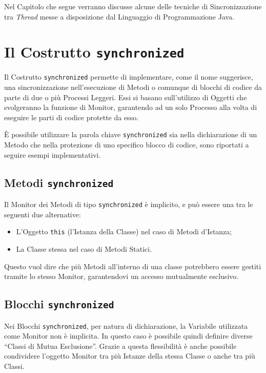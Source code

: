 Nel Capitolo che segue verranno discusse alcune delle tecniche di Sincronizzazione tra \textit{Thread} messe a disposizione dal Linguaggio di Programmazione Java.

\section{Il Costrutto \texttt{synchronized}}
Il Costrutto \texttt{synchronized} permette di implementare, come il nome suggerisce, una sincronizzazione nell'esecuzione di Metodi o comunque di blocchi di codice da parte di due o più Processi Leggeri\cite{Synchronized_JavaTutorial}. Essi si basano sull'utilizzo di Oggetti che svolgeranno la funzione di Monitor, garantendo ad un solo Processo alla volta di eseguire le parti di codice protette da esso. \par
È possibile utilizzare la parola chiave \texttt{synchronized} sia nella dichiarazione di un Metodo che nella protezione di uno specifico blocco di codice, sono riportati a seguire esempi implementativi.

\subsection{Metodi \texttt{synchronized}}
Il Monitor dei Metodi di tipo \texttt{synchronized} è implicito, e può essere una tra le seguenti due alternative:
\begin{itemize}
    \item L'Oggetto \texttt{this} (l'Istanza della Classe) nel caso di Metodi d'Istanza;
    \item La Classe stessa nel caso di Metodi Statici.
\end{itemize}
Questo vuol dire che più Metodi all'interno di una classe potrebbero essere gestiti tramite lo stesso Monitor, garantendovi un accesso mutualmente esclusivo. \par
\subsection{Blocchi \texttt{synchronized}}
Nei Blocchi \texttt{synchronized}, per natura di dichiarazione, la Variabile utilizzata come Monitor non è implicita. In questo caso è possibile quindi definire diverse ``Classi di Mutua Esclusione''. Grazie a questa flessibilità è anche possibile condividere l'oggetto Monitor tra più Istanze della stessa Classe o anche tra più Classi.
